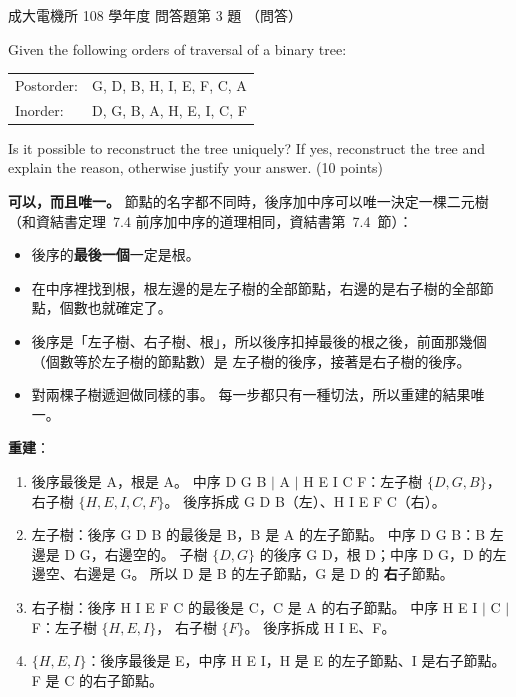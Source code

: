 \begin{pastexam}[label={px:ncku-108-ee-ds-04}]{成大電機所 108 學年度 問答題第 3 題}
（問答）

Given the following orders of traversal of a binary tree:

\quad\begin{tabular}{ll}
Postorder: & G, D, B, H, I, E, F, C, A\\
Inorder: & D, G, B, A, H, E, I, C, F\\
\end{tabular}

Is it possible to reconstruct the tree uniquely? If yes, reconstruct the tree and explain the
reason, otherwise justify your answer. (10 points)
\end{pastexam}

\begin{pastsoln}
\textbf{可以，而且唯一。} 節點的名字都不同時，後序加中序可以唯一決定一棵二元樹（和資結書定理~7.4
前序加中序的道理相同，資結書第~7.4~節）：
\begin{itemize}
\item 後序的\textbf{最後一個}一定是根。
\item 在中序裡找到根，根左邊的是左子樹的全部節點，右邊的是右子樹的全部節點，個數也就確定了。
\item 後序是「左子樹、右子樹、根」，所以後序扣掉最後的根之後，前面那幾個（個數等於左子樹的節點數）是
左子樹的後序，接著是右子樹的後序。
\item 對兩棵子樹遞迴做同樣的事。 每一步都只有一種切法，所以重建的結果唯一。
\end{itemize}

\textbf{重建}：
\begin{enumerate}
\item 後序最後是 A，根是 A。 中序 D G B $|$ A $|$ H E I C F：左子樹 $\{D, G, B\}$，右子樹 $\{H, E, I, C, F\}$。
後序拆成 G D B（左）、H I E F C（右）。
\item 左子樹：後序 G D B 的最後是 B，B 是 A 的左子節點。 中序 D G B：B 左邊是 D G，右邊空的。 子樹
$\{D, G\}$ 的後序 G D，根 D；中序 D G，D 的左邊空、右邊是 G。 所以 D 是 B 的左子節點，G 是 D 的
\textbf{右}子節點。
\item 右子樹：後序 H I E F C 的最後是 C，C 是 A 的右子節點。 中序 H E I $|$ C $|$ F：左子樹 $\{H, E, I\}$，
右子樹 $\{F\}$。 後序拆成 H I E、F。
\item $\{H, E, I\}$：後序最後是 E，中序 H E I，H 是 E 的左子節點、I 是右子節點。 F 是 C 的右子節點。
\end{enumerate}


\end{pastsoln}
